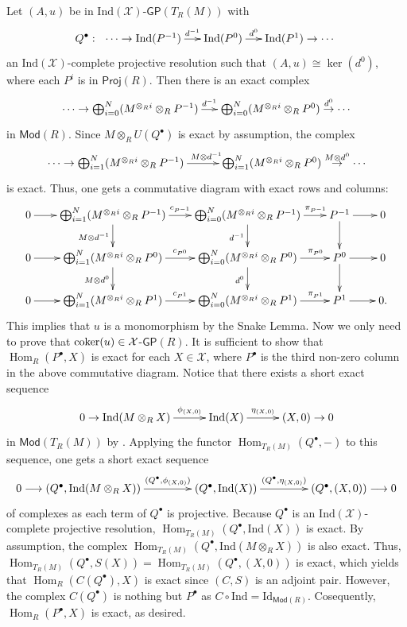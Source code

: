 \documentclass[10pt,twoside]{amsart}
\theoremstyle{bfupright head,slanted body}
\theoremstyle{bfupright head,upright body}
\theoremstyle{fixed bf head,slanted body}
\theoremstyle{fixed bf head,upright body}
\theoremstyle{numbered paragraph}
\newenvironment{prf*}[1][Proof]{%
  \begin{proof}[\bf #1]
    \setcounter{equation}{0}
    \renewcommand{\theequation}{\arabic{equation}}}
  {\end{proof}
}
\numberwithin{equation}{res}
\newcommand{\GP}{\mathsf{GP}}
\newcommand{\Proj}{\mathsf{Proj}}
\newcommand{\Mod}{\mathsf{Mod}}
\newcommand{\Ind}{\mathrm{Ind}}
\newcommand{\Id}{\mathrm{Id}}
\newcommand{\cok}{\mbox{\rm coker}}
\newcommand{\Hom}{\operatorname{Hom}}
\newcommand{\is}{\cong}
\begin{document}
\begin{prf*}
Let $(A,u)$ be in $\Ind(\mathcal{X})$-$\GP(T_R(M))$ with
$$Q^\bullet:\ \xymatrix@C=0.5cm{
\cdots \to \Ind(P^{-1}) \ar[r]^-{d^{-1}} & \Ind(P^{0})
\ar[r]^-{d^0} & \Ind(P^{1}) \to \cdots}$$
an $\Ind(\mathcal{X})$-complete projective resolution such that $(A,u)\is\ker(d^0)$,
where each $P^i$ is in $\Proj(R)$.
Then there is an exact complex
$$\xymatrix@C=0.5cm{
\cdots \to
\bigoplus_{i=0}^N(M^{\otimes_Ri}\otimes_RP^{-1})
\ar[r]^{\,\,d^{-1}} & \bigoplus_{i=0}^N(M^{\otimes_Ri}\otimes_RP^0)
\overset{d^{0}}\to \cdots}$$
in $\Mod(R)$.
Since $M\otimes_RU(Q^\bullet)$ is exact by assumption, the complex
$$\xymatrix@C=1cm{\cdots \to \bigoplus_{i=1}^N(M^{\otimes_Ri}\otimes_RP^{-1})
\ar[r]^{\,\, M\otimes d^{-1}} &
\bigoplus_{i=1}^N(M^{\otimes_Ri}\otimes_RP^0) \overset{M\otimes d^{0}}\to \cdots}$$
is exact. Thus, one gets a commutative diagram with exact rows and columns:
$$
\xymatrix@C=0.7cm@R=0.7cm{
  0 \ar[r]^{}
  & \bigoplus_{i=1}^N(M^{\otimes_Ri}\otimes_RP^{-1}) \ar[d]_{M\otimes d^{-1}}
  \ar[r]^{c_{P^{-1}}}
  & \bigoplus_{i=0}^N(M^{\otimes_Ri}\otimes_RP^{-1})
    \ar[d]_{d^{-1}} \ar[r]^{\qquad \qquad \pi_{P^{-1}}}
  & P^{-1} \ar[d]_{} \ar[r]^{} & 0  \\
  0 \ar[r]^{}
  & \bigoplus_{i=1}^N(M^{\otimes_Ri}\otimes_RP^0) \ar[d]_{M\otimes d^0}
    \ar[r]^{c_{P^0}}
  & \bigoplus_{i=0}^N(M^{\otimes_Ri}\otimes_RP^0)
    \ar[d]_{d^0} \ar[r]^{\qquad \qquad \pi_{P^0}}
  & P^0 \ar[d]_{} \ar[r]^{} & 0  \\
  0 \ar[r]^{}
  & \bigoplus_{i=1}^N(M^{\otimes_Ri}\otimes_RP^1)
  \ar[r]^{c_{P^1}}
  & \bigoplus_{i=0}^N(M^{\otimes_Ri}\otimes_RP^1)
  \ar[r]^{\qquad \qquad \pi_{P^1}}
  & P^1 \ar[r]^{} & 0. }$$
This implies that $u$ is a monomorphism by the Snake Lemma.
Now we only need to prove that $\cok(u)\in\mathcal{X}$-$\GP(R)$.
It is sufficient to show that $\Hom_R(P^\bullet, X)$ is exact for each $X \in \mathcal{X}$,
where $P^\bullet$ is the third non-zero column in the above commutative diagram.
Notice that there exists a short exact sequence
$$\xymatrix@C=1cm{0 \to
\Ind(M\otimes_R X) \ar[r]^-{\phi_{(X,0)}} &
\Ind(X) \ar[r]^-{\eta_{(X,0)}} & (X,0) \to 0}$$
in $\Mod(T_R(M))$ by \cite[Remark 1.5]{DL}.
Applying the functor $\Hom_{T_R(M)}(Q^\bullet, -)$ to this sequence, one gets a short exact sequence
\[\xymatrix@C=1.5cm{ 0 \longrightarrow  (Q^\bullet,\Ind(M\otimes_R X))\ar[r]^-{(Q^\bullet,\phi_{(X,0)})} &
(Q^\bullet,\Ind(X))
 \ar[r]^-{(Q^\bullet,\eta_{(X,0)})} &(Q^\bullet,(X,0)) \longrightarrow 0}
\]
of complexes as each term of $Q^\bullet$ is projective.
Because $Q^\bullet$ is an $\Ind(\mathcal{X})$-complete projective resolution, $\Hom_{T_R(M)}(Q^\bullet,\Ind(X))$ is exact. By assumption, the complex $\Hom_{T_R(M)}(Q^\bullet, \Ind(M\otimes_RX))$ is also exact.
Thus, $\Hom_{T_R(M)}(Q^\bullet, S(X))=\Hom_{T_R(M)}(Q^\bullet, (X, 0))$ is exact, which yields that $\Hom_R(C(Q^\bullet), X)$ is exact since $(C, S)$ is an adjoint pair.
However, the complex $C(Q^\bullet)$ is nothing but $P^\bullet$
as $C\circ\Ind=\Id_{\Mod(R)}$.
Cosequently, $\Hom_R(P^\bullet, X)$ is exact, as desired.
\end{prf*}
\end{document}
